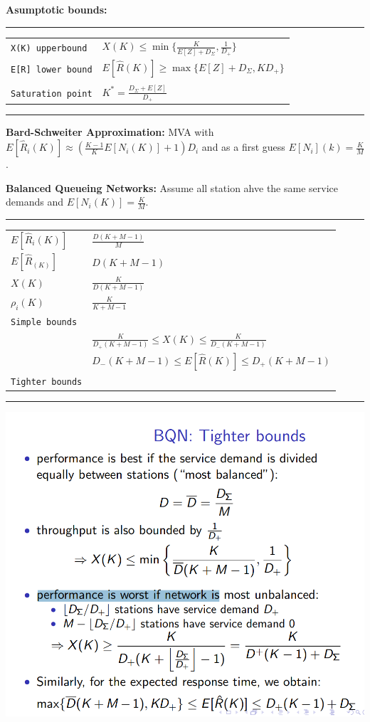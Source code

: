 \textbf{Asumptotic bounds:}
\hrule
{}
\begin{tabular}{@{}p{\the\MyLen}@{}p{\linewidth-\the\MyLen}@{}}
\verb!X(K) upperbound! 	&  $X(K) \leq \min\{\frac{K}{E[Z] + D_\Sigma}, \frac{1}{D_+}\}$\\
\verb!E[R] lower bound! 	&  $E[\hat{R}(K)] \geq \max\{E[Z] + D_\Sigma, KD_+\}$\\
\verb!! 	&  \\
\verb!Saturation point! 	&  $K^*  = \frac{D_\Sigma + E[Z]}{D_+}$\\
\end{tabular}
\hrule

\textbf{Bard-Schweiter Approximation:}
MVA with $E[\hat{R}_i(K)] \approx (\frac{K-1}{K} E[N_i(K)] + 1) D_i$ and as a first guess $E[N_i](k) = \frac{K}{M}$.

\textbf{Balanced Queueing Networks:} Assume all station ahve the same service demands and $E[N_i(K)] = \frac{K}{M}$.
\hrule
{}
\begin{tabular}{@{}p{\the\MyLen}@{}p{\linewidth-\the\MyLen}@{}}
$E[\hat{R}_i(K)]$ 	&  $\frac{D(K+M-1)}{M}$\\
$E[\hat{R}_(K)]$ 	&  $D(K+M-1)$\\
$X(K)$ 	&  $\frac{K}{D(K+M-1)}$\\
$\rho_i(K)$ 	&  $\frac{K}{K+M-1}$\\
\verb!Simple bounds! 	&  \\
			& $\frac{K}{D_+(K+M-1)} \leq X(K) \leq \frac{K}{D_-(K+M-1)}$\\
			& $D_-(K+M-1) \leq E[\hat{R}(K)] \leq D_+(K+M-1)$\\
\verb!Tighter bounds! 	&  \\

\end{tabular}
\hrule
\includegraphics[scale=0.2]{images/geen_zin_meer.png}